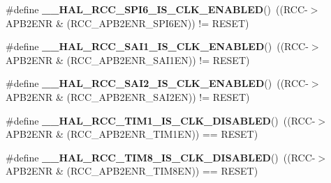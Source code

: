 \begin{DoxyCompactItemize}
\mbox{\label{group___r_c_c_ex___peripheral___clock___enable___disable___status_gac972718836d2c4e0d3bc477ee2c8a6fc}} 
\#define {\bfseries \+\_\+\+\_\+\+H\+A\+L\+\_\+\+R\+C\+C\+\_\+\+S\+P\+I6\+\_\+\+I\+S\+\_\+\+C\+L\+K\+\_\+\+E\+N\+A\+B\+L\+ED}()~((R\+CC-\/$>$A\+P\+B2\+E\+NR \& (R\+C\+C\+\_\+\+A\+P\+B2\+E\+N\+R\+\_\+\+S\+P\+I6\+EN)) != R\+E\+S\+ET)
\item 
\mbox{\label{group___r_c_c_ex___peripheral___clock___enable___disable___status_ga64dcc05f8484e6a139d0f6f4e1531fff}} 
\#define {\bfseries \+\_\+\+\_\+\+H\+A\+L\+\_\+\+R\+C\+C\+\_\+\+S\+A\+I1\+\_\+\+I\+S\+\_\+\+C\+L\+K\+\_\+\+E\+N\+A\+B\+L\+ED}()~((R\+CC-\/$>$A\+P\+B2\+E\+NR \& (R\+C\+C\+\_\+\+A\+P\+B2\+E\+N\+R\+\_\+\+S\+A\+I1\+EN)) != R\+E\+S\+ET)
\item 
\mbox{\label{group___r_c_c_ex___peripheral___clock___enable___disable___status_gadaadbe8243cce3a024b50c710314af58}} 
\#define {\bfseries \+\_\+\+\_\+\+H\+A\+L\+\_\+\+R\+C\+C\+\_\+\+S\+A\+I2\+\_\+\+I\+S\+\_\+\+C\+L\+K\+\_\+\+E\+N\+A\+B\+L\+ED}()~((R\+CC-\/$>$A\+P\+B2\+E\+NR \& (R\+C\+C\+\_\+\+A\+P\+B2\+E\+N\+R\+\_\+\+S\+A\+I2\+EN)) != R\+E\+S\+ET)
\item 
\mbox{\label{group___r_c_c_ex___peripheral___clock___enable___disable___status_ga7116893adbb7fc144102af49de55350b}} 
\#define {\bfseries \+\_\+\+\_\+\+H\+A\+L\+\_\+\+R\+C\+C\+\_\+\+T\+I\+M1\+\_\+\+I\+S\+\_\+\+C\+L\+K\+\_\+\+D\+I\+S\+A\+B\+L\+ED}()~((R\+CC-\/$>$A\+P\+B2\+E\+NR \& (R\+C\+C\+\_\+\+A\+P\+B2\+E\+N\+R\+\_\+\+T\+I\+M1\+EN)) == R\+E\+S\+ET)
\item 
\mbox{\label{group___r_c_c_ex___peripheral___clock___enable___disable___status_gae8d9acd515c3fa3a3607c4d527d431c5}} 
\#define {\bfseries \+\_\+\+\_\+\+H\+A\+L\+\_\+\+R\+C\+C\+\_\+\+T\+I\+M8\+\_\+\+I\+S\+\_\+\+C\+L\+K\+\_\+\+D\+I\+S\+A\+B\+L\+ED}()~((R\+CC-\/$>$A\+P\+B2\+E\+NR \& (R\+C\+C\+\_\+\+A\+P\+B2\+E\+N\+R\+\_\+\+T\+I\+M8\+EN)) == R\+E\+S\+ET)
\item 
\mbox{\label{group___r_c_c_ex___peripheral___clock___enable___disable___status_ga22c9d59ac6062298a71eed0d6a4a9afd}} 

\end{DoxyCompactItemize}

